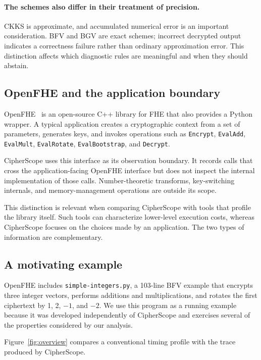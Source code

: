 \documentclass[sigconf,nonacm]{acmart}
\begin{document}
\paragraph{The schemes also differ in their treatment of precision.} CKKS is
approximate, and accumulated numerical error is an important consideration.
BFV and BGV are exact schemes; incorrect decrypted output indicates a
correctness failure rather than ordinary approximation error. This
distinction affects which diagnostic rules are meaningful and when they
should abstain.

\subsection{OpenFHE and the application boundary}

OpenFHE~\cite{openfhe2022} is an open-source C++ library for FHE that also
provides a Python wrapper. A typical application creates a cryptographic
context from a set of parameters, generates keys, and invokes operations such
as \texttt{Encrypt}, \texttt{EvalAdd}, \texttt{EvalMult},
\texttt{EvalRotate}, \texttt{EvalBootstrap}, and \texttt{Decrypt}.

CipherScope uses this interface as its observation boundary. It records calls
that cross the application-facing OpenFHE interface but does not inspect the
internal implementation of those calls. Number-theoretic transforms,
key-switching internals, and memory-management operations are outside its
scope.

This distinction is relevant when comparing CipherScope with tools that
profile the library itself. Such tools can characterize lower-level execution
costs, whereas CipherScope focuses on the choices made by an application. The
two types of information are complementary.

\subsection{A motivating example}
\label{sec:example}

OpenFHE includes \texttt{simple-integers.py}, a 103-line BFV example that
encrypts three integer vectors, performs additions and multiplications, and
rotates the first ciphertext by 1, 2, $-1$, and $-2$. We use this program as
a running example because it was developed independently of CipherScope and
exercises several of the properties considered by our analysis.

Figure~\ref{fig:overview} compares a conventional timing profile with the
trace produced by CipherScope.
\end{document}

